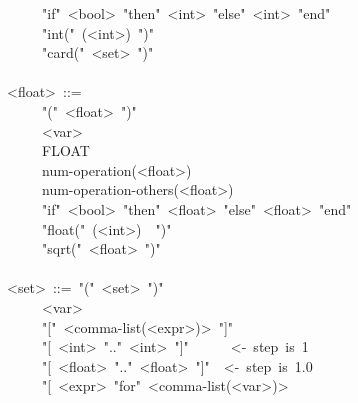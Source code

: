 \begin{footnotesize}
\begin{mdpre}
~~~~\textbar{}~"if"~{\textless{}bool\textgreater{}}~"then"~{\textless{}int\textgreater{}}~"else"~{\textless{}int\textgreater{}}~"end"\\
~~~~\textbar{}~"int("~({\textless{}int\textgreater{}})~")"\\
~~~~\textbar{}~"card("~{\textless{}set\textgreater{}}~")"\\
\\
{\textless{}float\textgreater{}}~::=\\
~~~~\textbar{}~"("~{\textless{}float\textgreater{}}~")"\\
~~~~\textbar{}~{\textless{}var\textgreater{}}\\
~~~~\textbar{}~FLOAT\\
~~~~\textbar{}~num-operation({\textless{}float\textgreater{}})\\
~~~~\textbar{}~num-operation-others({\textless{}float\textgreater{}})\\
~~~~\textbar{}~"if"~{\textless{}bool\textgreater{}}~"then"~{\textless{}float\textgreater{}}~"else"~{\textless{}float\textgreater{}}~"end"\\
~~~~\textbar{}~"float("~({\textless{}int\textgreater{}})~~")"\\
~~~~\textbar{}~"sqrt("~{\textless{}float\textgreater{}}~")"\\
\\
{\textless{}set\textgreater{}}~::=~"("~{\textless{}set\textgreater{}}~")"\\
~~~~\textbar{}~{\textless{}var\textgreater{}}\\
~~~~\textbar{}~"{}["~{\textless{}comma-list(\textless{}expr\textgreater{})\textgreater{}}~"]"\\
~~~~\textbar{}~"{}[~{\textless{}int\textgreater{}}~".."~{\textless{}int\textgreater{}}~"]"~~~~~~{\textless{}-~step~is~1}\\
~~~~\textbar{}~"{}[~{\textless{}float\textgreater{}}~".."~{\textless{}float\textgreater{}}~"]"~~{\textless{}-~step~is~1.0}\\
~~~~\textbar{}~"{}[~{\textless{}expr\textgreater{}}~"for"~{\textless{}comma-list(\textless{}var\textgreater{})\textgreater{}}\\

\end{mdpre}
\end{footnotesize}
